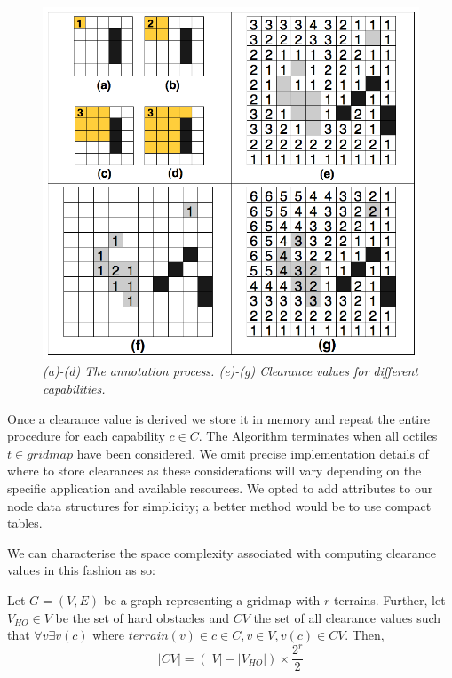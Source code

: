\begin{figure}[htbp]
       \caption{\emph{(a)-(d) The annotation process. (e)-(g) Clearance values for different capabilities.}}
       \begin{center}
                       \includegraphics[scale=0.25]{diagrams/annotations.png}
       \end{center}
       \label{aha-fig:annotations}
\end{figure}

Once a clearance value is derived we store it in memory and repeat the entire procedure for each capability $c \in C$. The Algorithm terminates when all octiles $t \in gridmap$ have been considered. 
We omit precise implementation details of where to store clearances as these considerations will vary depending on the specific application and available resources. We opted to add attributes to our node data structures for simplicity; a better method would be to use compact tables.
\par \indent
We can characterise the space complexity associated with computing clearance values in this fashion as so:
\begin{lemma}
\label{aha-lemma:numannotations}
Let $G = (V, E)$ be a graph representing a gridmap with $r$ terrains. 
Further, let $V_{HO} \in V$ be the set of hard obstacles and $CV$ the set of all clearance values such that $\forall v \exists v(c)$ where $terrain(v) \in c \in C, v \in V, v(c) \in CV$. Then, 
$$|CV| = (|V| - |V_{HO}|)\times \frac{2^r}{2}$$
\end{lemma}

